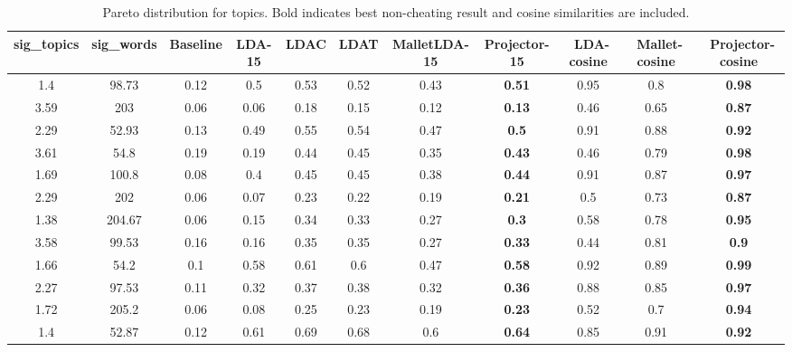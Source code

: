 \begin{table}
{\small
\begin{tabular}{|c|c|c|c|c|c|c|c|c|c|c|}
\hline 
sig\_topics &sig\_words &Baseline &LDA-15 &LDAC &LDAT &MalletLDA-15 &Projector-15 &~LDA-cosine &~Mallet-cosine &~Projector-cosine \\
 \hline 
1.4  &98.73  &{0.12}
  &{0.5}
  &{0.53}
  &{0.52}
  &{0.43}
  &\textbf{0.51}
  &0.95  &0.8  &\textbf{0.98}  \\
 \hline 
3.59  &203  &{0.06}
  &{0.06}
  &{0.18}
  &{0.15}
  &{0.12}
  &\textbf{0.13}
  &0.46  &0.65  &\textbf{0.87}  \\
 \hline 
2.29  &52.93  &{0.13}
  &{0.49}
  &{0.55}
  &{0.54}
  &{0.47}
  &\textbf{0.5}
  &0.91  &0.88  &\textbf{0.92}  \\
 \hline 
3.61  &54.8  &{0.19}
  &{0.19}
  &{0.44}
  &{0.45}
  &{0.35}
  &\textbf{0.43}
  &0.46  &0.79  &\textbf{0.98}  \\
 \hline 
1.69  &100.8  &{0.08}
  &{0.4}
  &{0.45}
  &{0.45}
  &{0.38}
  &\textbf{0.44}
  &0.91  &0.87  &\textbf{0.97}  \\
 \hline 
2.29  &202  &{0.06}
  &{0.07}
  &{0.23}
  &{0.22}
  &{0.19}
  &\textbf{0.21}
  &0.5  &0.73  &\textbf{0.87}  \\
 \hline 
1.38  &204.67  &{0.06}
  &{0.15}
  &{0.34}
  &{0.33}
  &{0.27}
  &\textbf{0.3}
  &0.58  &0.78  &\textbf{0.95}  \\
 \hline 
3.58  &99.53  &{0.16}
  &{0.16}
  &{0.35}
  &{0.35}
  &{0.27}
  &\textbf{0.33}
  &0.44  &0.81  &\textbf{0.9}  \\
 \hline 
1.66  &54.2  &{0.1}
  &{0.58}
  &{0.61}
  &{0.6}
  &{0.47}
  &\textbf{0.58}
  &0.92  &0.89  &\textbf{0.99}  \\
 \hline 
2.27  &97.53  &{0.11}
  &{0.32}
  &{0.37}
  &{0.38}
  &{0.32}
  &\textbf{0.36}
  &0.88  &0.85  &\textbf{0.97}  \\
 \hline 
1.72  &205.2  &{0.06}
  &{0.08}
  &{0.25}
  &{0.23}
  &{0.19}
  &\textbf{0.23}
  &0.52  &0.7  &\textbf{0.94}  \\
 \hline 
1.4  &52.87  &{0.12}
  &{0.61}
  &{0.69}
  &{0.68}
  &{0.6}
  &\textbf{0.64}
  &0.85  &0.91  &\textbf{0.92}  \\
 \hline 

\end{tabular}
}

\caption{Pareto distribution for topics. Bold indicates best non-cheating result
and cosine similarities are included.}
\label{tab:pareto}
\end{table}

